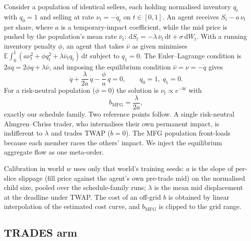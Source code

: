 Consider a population of identical sellers, each holding normalised inventory $q_t$ with $q_0=1$ and selling at rate $\nu_t=-\dot q_t$ on $t\in[0,1]$. An agent receives $S_t - a\,\nu_t$ per share, where $a$ is a temporary-impact coefficient, while the mid price is pushed by the population's mean rate $\bar\nu_t$: $\mathrm{d}S_t = -\lambda\,\bar\nu_t\,\mathrm{d}t + \sigma\,\mathrm{d}W_t$. With a running inventory penalty $\phi$, an agent that takes $\bar\nu$ as given minimises $\mathbb{E}\!\int_0^1 (a\nu_t^2 + \phi q_t^2 + \lambda\bar\nu_t q_t)\,\mathrm{d}t$ subject to $q_1=0$. The Euler--Lagrange condition is $2a\ddot q = 2\phi q + \lambda\bar\nu$, and imposing the equilibrium condition $\bar\nu=\nu=-\dot q$ gives
\begin{equation}
\ddot q + \frac{\lambda}{2a}\,\dot q - \frac{\phi}{a}\,q = 0,\qquad q_0=1,\; q_1=0 .
\label{eq:mfg}
\end{equation}
For a risk-neutral population ($\phi=0$) the solution is $\nu_t\propto e^{-bt}$ with
\begin{equation}
b_{\mathrm{MFG}} = \frac{\lambda}{2a},
\label{eq:bmfg}
\end{equation}
exactly our schedule family. Two reference points follow. A single risk-neutral Almgren--Chriss trader, who internalises their own permanent impact, is indifferent to $\lambda$ and trades TWAP ($b=0$). The MFG population front-loads because each member races the others' impact. We inject the equilibrium aggregate flow as one meta-order.

Calibration in world $w$ uses only that world's training seeds: $a$ is the slope of per-slice slippage (fill price against the agent's own pre-trade mid) on the normalised child size, pooled over the schedule-family runs; $\lambda$ is the mean mid displacement at the deadline under TWAP. The cost of an off-grid $b$ is obtained by linear interpolation of the estimated cost curve, and $b_{\mathrm{MFG}}$ is clipped to the grid range.

\subsection{TRADES arm}
\label{sec:trades}

